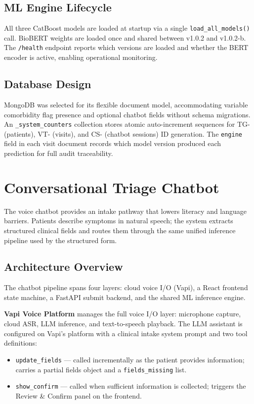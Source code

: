 \documentclass[conference]{IEEEtran}
\begin{document}
\subsection{ML Engine Lifecycle}
All three CatBoost models are loaded at startup via a single \texttt{load\_all\_models()} call. BioBERT weights are loaded once and shared between v1.0.2 and v1.0.2-b. The \texttt{/health} endpoint reports which versions are loaded and whether the BERT encoder is active, enabling operational monitoring.

\subsection{Database Design}
MongoDB was selected for its flexible document model, accommodating variable comorbidity flag presence and optional chatbot fields without schema migrations. An \texttt{\_system\_counters} collection stores atomic auto-increment sequences for TG- (patients), VT- (visits), and CS- (chatbot sessions) ID generation. The \texttt{engine} field in each visit document records which model version produced each prediction for full audit traceability.

\section{Conversational Triage Chatbot}

The voice chatbot provides an intake pathway that lowers literacy and language barriers. Patients describe symptoms in natural speech; the system extracts structured clinical fields and routes them through the same unified inference pipeline used by the structured form.

\subsection{Architecture Overview}
The chatbot pipeline spans four layers: cloud voice I/O (Vapi), a React frontend state machine, a FastAPI submit backend, and the shared ML inference engine.

\textbf{Vapi Voice Platform} manages the full voice I/O layer: microphone capture, cloud ASR, LLM inference, and text-to-speech playback. The LLM assistant is configured on Vapi's platform with a clinical intake system prompt and two tool definitions:
\begin{itemize}
\item \texttt{update\_fields} --- called incrementally as the patient provides information; carries a partial fields object and a \texttt{fields\_missing} list.
\item \texttt{show\_confirm} --- called when sufficient information is collected; triggers the Review \& Confirm panel on the frontend.
\end{itemize}
\end{document}
